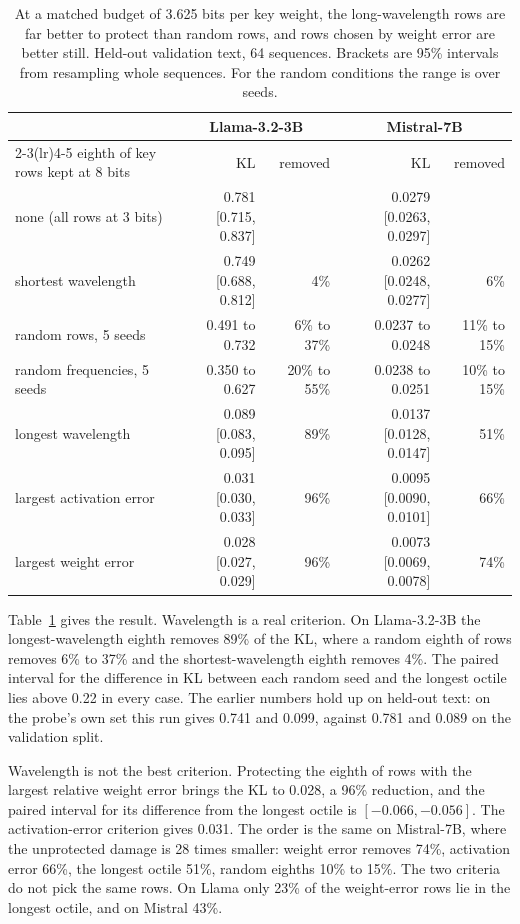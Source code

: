 \documentclass[10pt]{article}
\newcommand{\KL}{\mathrm{KL}}
\begin{document}
\begin{table}[t]
\centering
\small
\begin{tabular}{lrrrr}
\toprule
 & \multicolumn{2}{c}{Llama-3.2-3B} & \multicolumn{2}{c}{Mistral-7B} \\
\cmidrule(lr){2-3}\cmidrule(lr){4-5}
eighth of key rows kept at 8 bits & $\KL$ & removed & $\KL$ & removed \\
\midrule
none (all rows at 3 bits) & 0.781 [0.715, 0.837] & & 0.0279 [0.0263, 0.0297] & \\
shortest wavelength & 0.749 [0.688, 0.812] & 4\% & 0.0262 [0.0248, 0.0277] & 6\% \\
random rows, 5 seeds & 0.491 to 0.732 & 6\% to 37\% & 0.0237 to 0.0248 & 11\% to 15\% \\
random frequencies, 5 seeds & 0.350 to 0.627 & 20\% to 55\% & 0.0238 to 0.0251 & 10\% to 15\% \\
longest wavelength & 0.089 [0.083, 0.095] & 89\% & 0.0137 [0.0128, 0.0147] & 51\% \\
largest activation error & 0.031 [0.030, 0.033] & 96\% & 0.0095 [0.0090, 0.0101] & 66\% \\
largest weight error & 0.028 [0.027, 0.029] & 96\% & 0.0073 [0.0069, 0.0078] & 74\% \\
\bottomrule
\end{tabular}
\caption{At a matched budget of 3.625 bits per key weight, the long-wavelength rows are far better
to protect than random rows, and rows chosen by weight error are better still. Held-out
validation text, 64 sequences. Brackets are 95\% intervals from resampling whole sequences. For
the random conditions the range is over seeds.}
\label{tab:protect}
\end{table}

Table~\ref{tab:protect} gives the result. Wavelength is a real criterion. On Llama-3.2-3B the
longest-wavelength eighth removes 89\% of the KL, where a random eighth of rows removes 6\% to
37\% and the shortest-wavelength eighth removes 4\%. The paired interval for the difference in
KL between each random seed and the longest octile lies above 0.22 in every case. The earlier
numbers hold up on held-out text: on the probe's own set this run gives 0.741 and 0.099, against
0.781 and 0.089 on the validation split.

Wavelength is not the best criterion. Protecting the eighth of rows with the largest relative
weight error brings the KL to 0.028, a 96\% reduction, and the paired interval for its difference
from the longest octile is $[-0.066, -0.056]$. The activation-error criterion gives 0.031. The
order is the same on Mistral-7B, where the unprotected damage is 28 times smaller: weight error
removes 74\%, activation error 66\%, the longest octile 51\%, random eighths 10\% to 15\%. The two
criteria do not pick the same rows. On Llama only 23\% of the weight-error rows lie in the longest
octile, and on Mistral 43\%.
\end{document}
